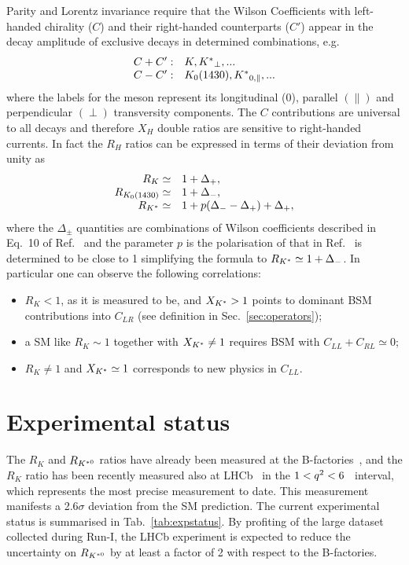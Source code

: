 Parity and Lorentz invariance require that the Wilson Coefficients with left-handed chirality ($C$)
and their right-handed counterparts ($C'$) appear in the decay amplitude of exclusive decays in
determined combinations, e.g.
\begin{equation}
\begin{array}{ll}
C+C': & K, {{K}^*}_{\perp}, ...  \\
C-C': & K_0(1430), {{K}^*}_{0,\parallel}, ...
\end{array}
\end{equation}
where the labels for the \Kstar meson represent its longitudinal (0), parallel $(\parallel)$ and
perpendicular $(\perp)$ transversity components. The $C$ contributions are universal to
all decays and therefore $X_H$ double ratios are sensitive to right-handed currents.
In fact the $R_H$ ratios can be expressed in terms of their deviation from unity as
\begin{equation}
\begin{array}{rl}
R_K \simeq 			& 1+ \Delta_+, 		\\
R_{K_0(1430)} \simeq 	& 1+ \Delta_-,		\\
R_{{K}^*} \simeq 		& 1+ p(\Delta_- - \Delta_+) + \Delta_+,
\end{array}
\end{equation}
where the $\Delta_\pm$ quantities are combinations of Wilson coefficients
described in Eq.~10 of Ref.~\cite{Hiller:2014ula} and the parameter $p$ is the polarisation of \Kstar
that in Ref.~\cite{Hiller:2014ula} is determined to be close to 1 simplifying the formula to $R_{{{K}^*}} \simeq 1+ \Delta_-$.
In particular one can observe the following correlations: 
\begin{itemize}
\item $R_K < 1$, as it is measured to be, and $X_{{{K}^*}} > 1$ points to dominant BSM contributions into $C_{LR}$ (see definition in Sec.~\ref{sec:operators});
\item a SM like $R_K \sim 1$ together with $X_{{{K}^*}} \neq 1$ requires BSM with $C_{LL} + C_{RL} \simeq 0$;
\item $R_K \neq 1$ and $X_{{{K}^*}} \simeq 1$ corresponds to new physics in $C_{LL}$.
\end{itemize}

\section{Experimental status}

The $R_K$ and $R_{{{K}^{*0}}}$ ratios have already been measured at the B-factories~\cite{Lees:2012tva,Wei:2009zv},
and the $R_K$ ratio has been recently measured also at LHCb~\cite{Aaij:2014ora} in the \mbox{$1 < {q^2} < 6$~\gevgevcccc} \qsq interval, which represents the most precise measurement to date. This measurement manifests a 2.6$\sigma$
deviation from the SM prediction. 
The current experimental status is summarised in Tab.~\ref{tab:expstatus}. By profiting of the large dataset collected during Run-I, the LHCb experiment is expected
to reduce the uncertainty on $R_{{{K}^{*0}}}$ by at least a factor of 2 with respect to the B-factories.

